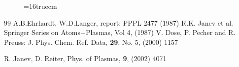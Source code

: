 \documentclass[12pt,dvipdfmx]{article}
\begin{document}
\begin{figure} \label{met.3_3.2}
\epsfxsize=16truecm
\end{figure}

\newpage
\begin{thebibliography}{99}
  A.B.Ehrhardt, W.D.Langer, report: PPPL 2477
                       (1987)
 R.K. Janev et al.  Springer Series on Atoms+Plasmas,
                   Vol 4, (1987)
  V. Dose, P. Pecher and R. Preuss: J. Phys. Chem. Ref. Data, \textbf{29}, No. 5, (2000) 1157

 R. Janev, D. Reiter, Phys. of Plasmas, \textbf{9}, (2002) 4071
\end{thebibliography}
\end{document}

